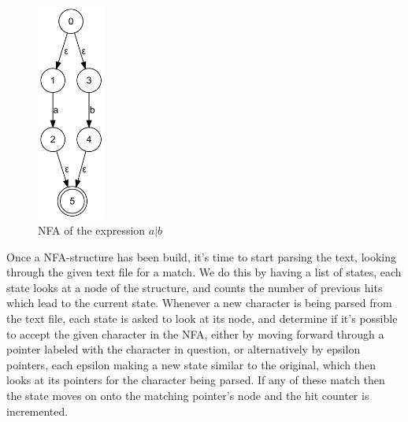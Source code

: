 \begin{figure}[h!]
  \centering
      \includegraphics[width=0.2\textwidth]{lib/A_OR_B.png}
  \caption{NFA of the expression $a | b$}
\label{fig:A_OR_B}
\end{figure}

Once a NFA-structure has been build, it's time to start parsing the text, looking through the given text file for a match. We do this by having a list of states, each state looks at a node of the structure, and counts the number of previous hits which lead to the current state. Whenever a new character is being parsed from the text file, each state is asked to look at its node, and determine if it's possible to accept the given character in the NFA, either by moving forward through a pointer labeled with the character in question, or alternatively by epsilon pointers, each epsilon making a new state similar to the original, which then looks at its pointers for the character being parsed. If any of these match then the state moves on onto the matching pointer's node and the hit counter is incremented. %

